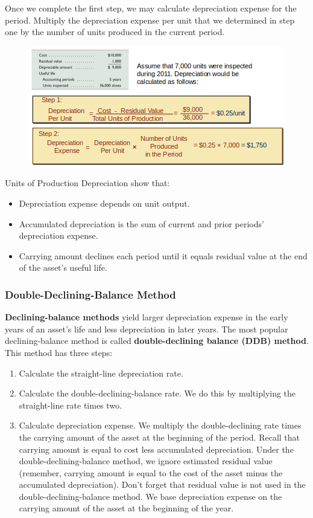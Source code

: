 \documentclass[../main.tex]{subfiles}
\begin{document}
 	Once we complete the first step, 
	we may calculate depreciation expense for the period. Multiply the 
	depreciation expense per unit that we determined in step one by the number 
	of units produced in the current period.

	\begin{figure}[ht!]
		\centering		
		\includegraphics[width=1\columnwidth]{images/c8/uop_eg.png}
	\end{figure}

	Units of Production Depreciation show that:
	\begin{itemize}[noitemsep]
		\item Depreciation expense depends on unit output.
		\item Accumulated depreciation is the sum of current and prior periods’ 
		depreciation expense.
		\item Carrying amount declines each period until it equals residual 
		value at the end of the asset’s useful life.
	\end{itemize}

	\subsubsection{Double-Declining-Balance Method}
	
	\textbf{Declining-balance methods} yield larger depreciation expense in the 
	early years of an asset’s life and less depreciation in later years. The 
	most popular declining-balance method is called \textbf{double-declining 
	balance (DDB) method}. This method has three steps:
	\begin{enumerate}[noitemsep]
		\item Calculate the straight-line depreciation rate. 
		\item Calculate the double-declining-balance rate. We do this by 
		multiplying the straight-line rate times two.
		\item Calculate depreciation expense. We multiply the double-declining 
		rate times the carrying amount of the asset at the beginning of the 
		period. Recall that carrying amount is equal to cost less accumulated 
		depreciation. Under the double-declining-balance method, we ignore 
		estimated residual value (remember, carrying amount is equal to the 
		cost of the asset minus the accumulated depreciation). Don’t forget 
		that residual value is not used in the double-declining-balance method. 
		We base depreciation expense on the carrying amount of the asset at the 
		beginning of the year.
	\end{enumerate}
	
\end{document}
